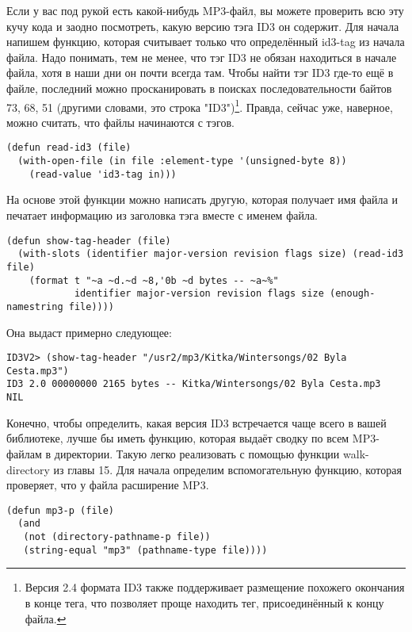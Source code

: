 Если у вас под рукой есть какой-нибудь MP3-файл, вы можете проверить всю эту кучу кода и
заодно посмотреть, какую версию тэга ID3 он содержит. Для начала напишем функцию, которая
считывает только что определённый id3-tag из начала файла. Надо понимать, тем не менее,
что тэг ID3 не обязан находиться в начале файла, хотя в наши дни он почти всегда там.
Чтобы найти тэг ID3 где-то ещё в файле, последний можно просканировать в поисках
последовательности байтов 73, 68, 51 (другими словами, это строка "ID3")\footnote{Версия
  2.4 формата ID3 также поддерживает размещение похожего окончания в конце тега, что
  позволяет проще находить тег, присоединённый к концу файла.}. Правда, сейчас уже,
наверное, можно считать, что файлы начинаются с тэгов.

\begin{lstlisting}
(defun read-id3 (file)
  (with-open-file (in file :element-type '(unsigned-byte 8))
    (read-value 'id3-tag in)))
\end{lstlisting}

На основе этой функции можно написать другую, которая получает имя файла и печатает
информацию из заголовка тэга вместе с именем файла.

\begin{lstlisting}
(defun show-tag-header (file)
  (with-slots (identifier major-version revision flags size) (read-id3 file)
    (format t "~a ~d.~d ~8,'0b ~d bytes -- ~a~%"
            identifier major-version revision flags size (enough-namestring file))))
\end{lstlisting}

Она выдаст примерно следующее:

\begin{verbatim}
ID3V2> (show-tag-header "/usr2/mp3/Kitka/Wintersongs/02 Byla Cesta.mp3")
ID3 2.0 00000000 2165 bytes -- Kitka/Wintersongs/02 Byla Cesta.mp3
NIL
\end{verbatim}

Конечно, чтобы определить, какая версия ID3 встречается чаще всего в вашей библиотеке,
лучше бы иметь функцию, которая выдаёт сводку по всем MP3-файлам в директории. Такую легко
реализовать с помощью функции walk-directory из главы 15. Для начала определим
вспомогательную функцию, которая проверяет, что у файла расширение MP3.

\begin{lstlisting}
(defun mp3-p (file)
  (and
   (not (directory-pathname-p file))
   (string-equal "mp3" (pathname-type file))))
\end{lstlisting}

